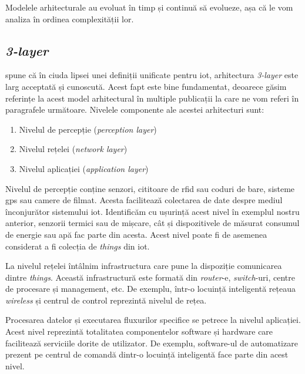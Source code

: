 
Modelele arhitecturale au evoluat în timp și continuă să evolueze, așa că le vom analiza în ordinea complexității lor.

\subsection{\textit{3-layer}}

\cite{MiaoWu2010} spune că în ciuda lipsei unei definiții unificate pentru \acrshort{iot}, arhitectura \textit{3-layer} este larg acceptată și cunoscută. Acest fapt este bine fundamentat, deoarece găsim referințe la acest model arhitectural în multiple publicații la care ne vom referi în paragrafele următoare. Nivelele componente ale acestei arhitecturi sunt:

\begin{enumerate}
    \item Nivelul de percepție (\textit{perception layer})
    \item Nivelul rețelei (\textit{network layer})
    \item Nivelul aplicației (\textit{application layer})
\end{enumerate}

Nivelul de percepție conține senzori, cititoare de \acrshort{rfid} sau coduri de bare, sisteme \acrfull{gps} sau camere de filmat. Acesta facilitează colectarea de date despre mediul înconjurător sistemului \acrshort{iot}. Identificăm cu ușurință acest nivel în exemplul nostru anterior, senzorii termici sau de mișcare, cât și dispozitivele de măsurat consumul de energie sau apă fac parte din acesta. Acest nivel poate fi de asemenea considerat a fi colecția de \textit{things} din \acrshort{iot}.

La nivelul rețelei întâlnim infrastructura care pune la dispoziție comunicarea dintre \textit{things}. Această infrastructură este formată din \textit{router}-e, \textit{switch}-uri, centre de procesare și management, etc. De exemplu, într-o locuință inteligentă rețeaua \textit{wireless} și centrul de control reprezintă nivelul de rețea.

Procesarea datelor și executarea fluxurilor specifice se petrece la nivelul aplicației. Acest nivel reprezintă totalitatea componentelor software și hardware care facilitează serviciile dorite de utilizator. De exemplu, software-ul de automatizare prezent pe centrul de comandă dintr-o locuință inteligentă face parte din acest nivel.

